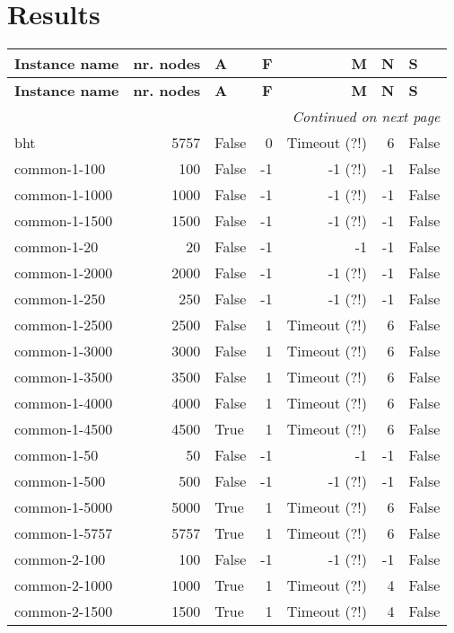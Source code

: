 \section{Results}
\begin{longtable}{lrlrrrl}\toprule \textbf{Instance name}& \textbf{nr. nodes}& \textbf{A}& \textbf{F}& \textbf{M}& \textbf{N}& \textbf{S}\\
\midrule
\endfirsthead
\toprule
 \textbf{Instance name}& \textbf{nr. nodes}& \textbf{A}& \textbf{F}& \textbf{M}& \textbf{N}& \textbf{S}\\
\midrule
\endhead
\midrule
\multicolumn{7}{r}{\textit{Continued on next page}} \\
\midrule
\endfoot
\bottomrule
\endlastfoot
bht & 5757 & False & 0 & Timeout (?!) & 6 & False \\
common-1-100 & 100 & False & -1 & -1 (?!) & -1 & False \\
common-1-1000 & 1000 & False & -1 & -1 (?!) & -1 & False \\
common-1-1500 & 1500 & False & -1 & -1 (?!) & -1 & False \\
common-1-20 & 20 & False & -1 & -1 & -1 & False \\
common-1-2000 & 2000 & False & -1 & -1 (?!) & -1 & False \\
common-1-250 & 250 & False & -1 & -1 (?!) & -1 & False \\
common-1-2500 & 2500 & False & 1 & Timeout (?!) & 6 & False \\
common-1-3000 & 3000 & False & 1 & Timeout (?!) & 6 & False \\
common-1-3500 & 3500 & False & 1 & Timeout (?!) & 6 & False \\
common-1-4000 & 4000 & False & 1 & Timeout (?!) & 6 & False \\
common-1-4500 & 4500 & True & 1 & Timeout (?!) & 6 & False \\
common-1-50 & 50 & False & -1 & -1 & -1 & False \\
common-1-500 & 500 & False & -1 & -1 (?!) & -1 & False \\
common-1-5000 & 5000 & True & 1 & Timeout (?!) & 6 & False \\
common-1-5757 & 5757 & True & 1 & Timeout (?!) & 6 & False \\
common-2-100 & 100 & False & -1 & -1 (?!) & -1 & False \\
common-2-1000 & 1000 & True & 1 & Timeout (?!) & 4 & False \\
common-2-1500 & 1500 & True & 1 & Timeout (?!) & 4 & False \\

\end{longtable}
